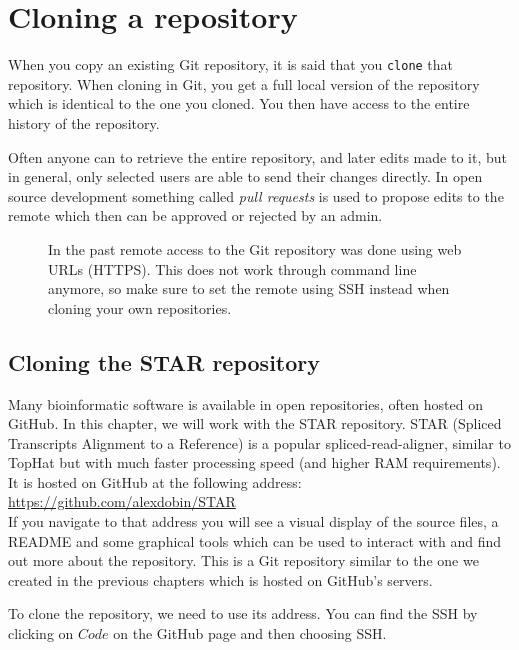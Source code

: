 \documentclass[../main/git_course_main.tex]{subfiles}
\begin{document}
	\section{Cloning a repository}
	
	When you copy an existing Git repository, it is said that you \verb$clone$ that repository. 
	When cloning in Git, you get a full local version of the repository which is identical
	to the one you cloned. You then have access to the entire history of the repository.
	
	Often anyone can to retrieve the entire repository, and later edits made to it,
	but in general, only selected users are able to send their changes directly. In open source development something called \textit{pull requests} is used to propose edits to the remote which then can be approved or rejected by an admin.
	
	\begin{figure}[h!]
		\begin{redbox}
			In the past remote access to the Git repository was done using web URLs (HTTPS). This does not work through command line anymore, so make sure to set the remote using SSH instead when cloning your own repositories.
		\end{redbox}
	\end{figure}
	
	\subsection{Cloning the STAR repository}
	
	Many bioinformatic software is available in open repositories, often hosted on GitHub. In this chapter, we will work with the STAR repository. STAR (Spliced Transcripts Alignment to a Reference) is a popular spliced-read-aligner, similar to TopHat but with much faster processing speed (and higher RAM requirements). It is hosted on GitHub at the following address: \\
	
	\url{https://github.com/alexdobin/STAR} \\
	
	If you navigate to that address you will see a visual display of the source files, a README and some graphical tools which can be used to interact with and find out more about the repository. This is a Git repository similar to the one we created in the previous chapters which is hosted on GitHub's servers.
	
	To clone the repository, we need to use its address. You can find the SSH by clicking on $Code$ on the GitHub page and then choosing SSH.
	
\end{document}
